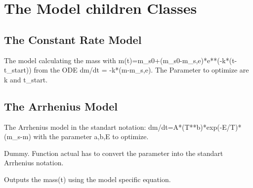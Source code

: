 \documentclass[letterpaper,10pt,english]{sphinxmanual}
\begin{document}
\section{The Model children Classes}
\label{FittingClasses:the-model-children-classes}

\subsection{The Constant Rate Model}
\label{FittingClasses:the-constant-rate-model}

\begin{fulllineitems}
\label{FittingClasses:Models.ConstantRateModel}
The model calculating the mass with m(t)=m\_s0+(m\_s0-m\_s,e)*e**(-k*(t-t\_start)) from the ODE dm/dt = -k*(m-m\_s,e). The Parameter to optimize are k and t\_start.

\end{fulllineitems}



\subsection{The Arrhenius Model}
\label{FittingClasses:the-arrhenius-model}

\begin{fulllineitems}
\label{FittingClasses:Models.ArrheniusModel}
The Arrhenius model in the standart notation: dm/dt=A*(T**b)*exp(-E/T)*(m\_s-m) with the parameter a,b,E to optimize.

\begin{fulllineitems}
\label{FittingClasses:Models.ArrheniusModel.ConvertKinFactors}
Dummy. Function actual has to convert the parameter into the standart Arrhenius notation.

\end{fulllineitems}


\begin{fulllineitems}
\label{FittingClasses:Models.ArrheniusModel.calcMass}
Outputs the mass(t) using the model specific equation.

\end{fulllineitems}


\end{fulllineitems}
\end{document}
